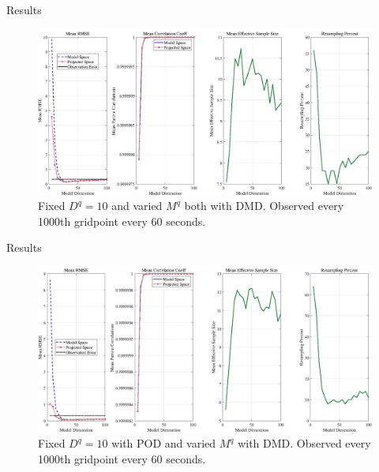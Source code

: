 \documentclass[aspectratio=169]{beamer}
\begin{document}

\begin{frame}{Results}
\vfill
    \begin{figure}[H]
        \centering
        \includegraphics[width=.9\textwidth]{figures/SWE_physical_proj_DMD_inth1000.png}
        \caption{Fixed $D^q = 10$ and varied $M^q$ both with DMD.  Observed every 1000th gridpoint every 60 seconds.}
    \end{figure}
\vfill
\end{frame}


\begin{frame}{Results}
\vfill
    \begin{figure}[H]
        \centering
        \includegraphics[width=.9\textwidth]{figures/SWE_physical_proj_DMDPOD_inth1000.png}
        \caption{Fixed $D^q = 10$ with POD and varied $M^q$ with DMD.  Observed every 1000th gridpoint every 60 seconds.}
    \end{figure}
\vfill
\end{frame}

\end{document}
